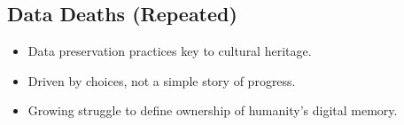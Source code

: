 \documentclass{article}
\begin{document}
\subsection*{Data Deaths (Repeated)}
\begin{itemize}
  \item Data preservation practices key to cultural heritage.
  \item Driven by choices, not a simple story of progress.
  \item Growing struggle to define ownership of humanity's digital memory.
\end{itemize}
\end{document}
